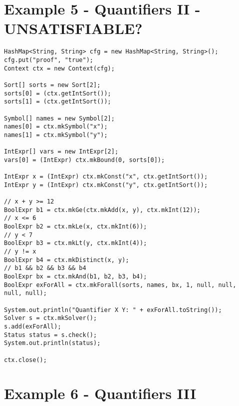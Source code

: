 \section{Example 5 - Quantifiers II - UNSATISFIABLE?}
\begin{lstlisting}[frame=single]
HashMap<String, String> cfg = new HashMap<String, String>();
cfg.put("proof", "true");
Context ctx = new Context(cfg);

Sort[] sorts = new Sort[2];
sorts[0] = (ctx.getIntSort());
sorts[1] = (ctx.getIntSort());

Symbol[] names = new Symbol[2];
names[0] = ctx.mkSymbol("x");
names[1] = ctx.mkSymbol("y");
		
IntExpr[] vars = new IntExpr[2];
vars[0] = (IntExpr) ctx.mkBound(0, sorts[0]);
		
IntExpr x = (IntExpr) ctx.mkConst("x", ctx.getIntSort());
IntExpr y = (IntExpr) ctx.mkConst("y", ctx.getIntSort());
		
// x + y >= 12
BoolExpr b1 = ctx.mkGe(ctx.mkAdd(x, y), ctx.mkInt(12));
// x <= 6
BoolExpr b2 = ctx.mkLe(x, ctx.mkInt(6));
// y < 7
BoolExpr b3 = ctx.mkLt(y, ctx.mkInt(4));
// y != x
BoolExpr b4 = ctx.mkDistinct(x, y);
// b1 && b2 && b3 && b4
BoolExpr bx = ctx.mkAnd(b1, b2, b3, b4);		
BoolExpr exForAll = ctx.mkForall(sorts, names, bx, 1, null, null, null, null);
		
System.out.println("Quantifier X Y: " + exForAll.toString());
Solver s = ctx.mkSolver();
s.add(exForAll);
Status status = s.check();
System.out.println(status);

ctx.close();
\end{lstlisting}

\section{Example 6 - Quantifiers III}
